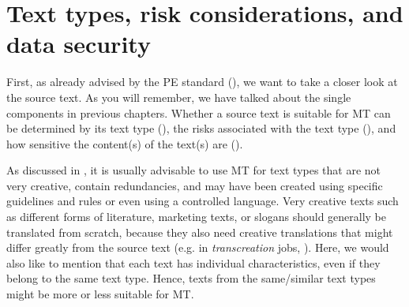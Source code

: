 \section{Text types, risk considerations, and data security}\label{sec:8:1}

First, as already advised by the PE standard (), we want to take a closer look at the source text. As you will remember, we have talked about the single components in previous chapters. Whether a source text is suitable for MT can be determined by its text type (), the risks associated with the text type (), and how sensitive the content(s) of the text(s) are ().

As discussed in , it is usually advisable to use MT for text types that are not very creative, contain redundancies, and may have been created using specific guidelines and rules or even using a controlled language. Very creative texts such as different forms of literature, marketing texts, or slogans should generally be translated from scratch, because they also need creative translations that might differ greatly from the source text (e.g. in \textit{transcreation} jobs, \citealt{pedersen2014exploring}). Here, we would also like to mention that each text has individual characteristics, even if they belong to the same text type. Hence, texts from the same/similar text types might be more or less suitable for MT.


